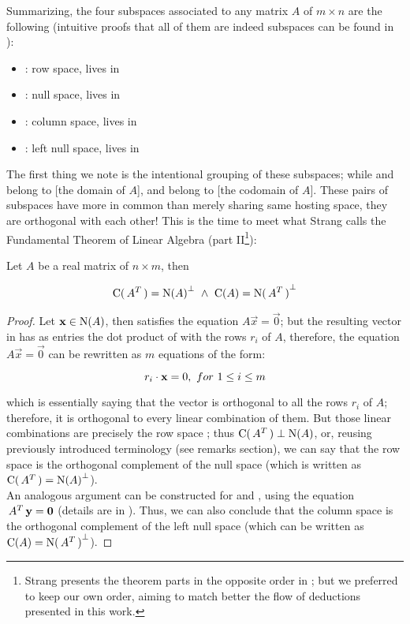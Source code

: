 Summarizing, the four subspaces associated to any
matrix $A$ of $m \times n$ are the following (intuitive proofs that
all of them are indeed subspaces can be found in \cite{strang88}): \\

\begin{itemize}
\item {}: row space, lives in 
\item {}: null space, lives in 
\item {}: column space, lives in 
\item {}: left null space, lives in 
\end{itemize}
\hfill

The first thing we note is the intentional grouping of these subspaces;
while  and  belong to  [the domain of $A$],
 and  belong to  [the codomain of $A$]. These
pairs of subspaces have more in common than merely sharing same
hosting space, they are orthogonal with each other! This is the time
to meet what Strang calls the Fundamental Theorem of Linear Algebra
(part II\footnote{Strang presents the theorem parts in the opposite order
  in \cite{strang88};
  but we preferred to keep our own order, aiming to match better the
  flow of deductions presented in this work.}): \\

\begin{theorem}
\label{thm:Fund1}
Let $A$ be a real matrix of $n \times m$, then 

\[
\operatorname{C}(\,{A}^{T}\,) = {\operatorname{N}(A)}^{\bot} \,\,\land\,\, \operatorname{C}(A) = {\operatorname{N}(\,{A}^{T}\,)}^{\bot}
\]
\end{theorem}
\hfill

\begin{proof}
Let $\mathbf{x} \in \operatorname{N}(A)$, then  satisfies the equation $A\vec{x}
= \vec{0}$; but the resulting vector in  has as entries the dot product
of  with the rows $r_i$ of $A$, therefore, the equation $A\vec{x} =
\vec{0}$ can be rewritten as $m$ equations of the form:

\[
r_i \cdot \mathbf{x} = 0, \,\,for \,\, 1 \le i \le m
\]

which is essentially saying that the vector  is orthogonal to
all the rows $r_i$ of $A$; therefore, it is orthogonal to every linear
combination of them. But those linear combinations are precisely the
row space ; thus $\operatorname{C}(\,{A}^{T}\,) \perp \operatorname{N}(A)$, or,
reusing previously introduced terminology (see remarks section), we
can say that the row space is the orthogonal complement of the null
space (which is written as $\operatorname{C}(\,{A}^{T}\,) = {\operatorname{N}(A)}^{\bot}$).  \\ 

An analogous argument can be constructed for  and ,
using the equation $\,{A}^{T}\,\mathbf{y} = \mathbf{0}$ (details are in
\cite{strang88}). Thus, we can also conclude that the column space is
the orthogonal complement of the left null space (which can be written as $\operatorname{C}(A) =
{\operatorname{N}(\,{A}^{T}\,)}^{\bot}$). 
\end{proof}

